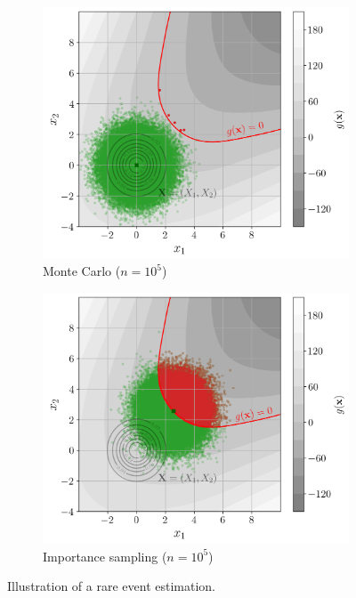 \begin{figure}[ht]
    \centering
    \begin{subfigure}[b]{0.48\textwidth}
        \centering
        \includegraphics[width=\textwidth]{../numerical_experiments/chapter1/figures/reliability_MC_illustration.png}
        \caption{Monte Carlo ($n=10^5$)}
    \end{subfigure}
    \hfill
    \begin{subfigure}[b]{0.48\textwidth}
        \centering
        \includegraphics[width=\textwidth]{../numerical_experiments/chapter1/figures/reliability_IS_illustration.png}
        \caption{Importance sampling ($n=10^5$)}
    \end{subfigure}
    \caption{Illustration of a rare event estimation.}
    \label{fig:IS_reliability}
\end{figure}

